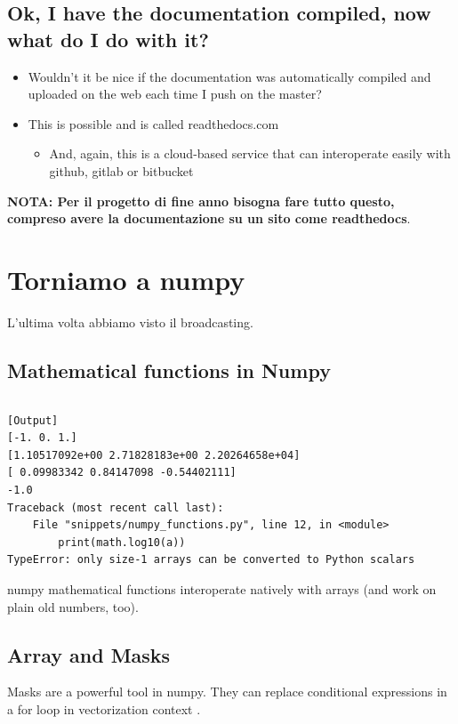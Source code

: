 \subsection{Ok, I have the documentation compiled, now what do I do with it?}

  \begin{itemize}
  \item Wouldn't it be nice if the documentation was automatically compiled and
    uploaded on the web each time I push on the master?
  \item This is possible and is called readthedocs.com
    \begin{itemize}
    \item And, again, this is a cloud-based service that can interoperate
      easily with github, gitlab or bitbucket
    \end{itemize}
  \end{itemize}


\textbf{NOTA: Per il progetto di fine anno bisogna fare tutto questo, compreso avere la documentazione su un sito come readthedocs}.


\newpage

\section{Torniamo a numpy}
L'ultima volta abbiamo visto il broadcasting.\\

\subsection{Mathematical functions in Numpy}

\inputminted{python}{snippets/numpy_functions.py}

\begin{verbatim}
[Output]
[-1. 0. 1.]
[1.10517092e+00 2.71828183e+00 2.20264658e+04]
[ 0.09983342 0.84147098 -0.54402111]
-1.0
Traceback (most recent call last):
    File "snippets/numpy_functions.py", line 12, in <module>
        print(math.log10(a))
TypeError: only size-1 arrays can be converted to Python scalars
\end{verbatim}

numpy mathematical functions interoperate natively with arrays (and work on plain old numbers, too).

\subsection{Array and Masks}
Masks are a powerful tool in numpy. They can replace conditional expressions in a for loop in vectorization context .

